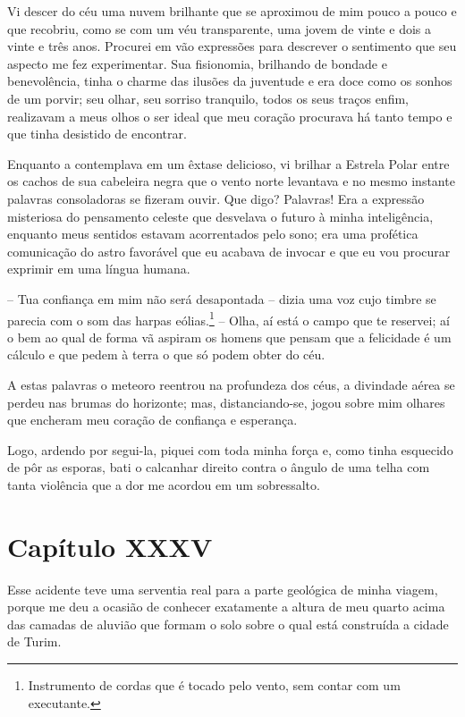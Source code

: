  Vi descer do céu uma nuvem brilhante que se aproximou de mim pouco a
pouco e que recobriu, como se com um véu transparente, uma jovem de
vinte e dois a vinte e três anos. Procurei em vão expressões para
descrever o sentimento que seu aspecto me fez experimentar. Sua
fisionomia, brilhando de bondade e benevolência, tinha o charme das
ilusões da juventude e era doce como os sonhos de um porvir; seu olhar,
seu sorriso tranquilo, todos os seus traços enfim, realizavam a meus olhos
o ser ideal que meu coração procurava há tanto tempo e que tinha
desistido de encontrar.

 Enquanto a contemplava em um êxtase delicioso, vi brilhar a Estrela
Polar entre os cachos de sua cabeleira negra que o vento norte
levantava e no mesmo instante palavras consoladoras se fizeram ouvir.
Que digo? Palavras! Era a expressão misteriosa do pensamento celeste
que desvelava o futuro à minha inteligência, enquanto meus sentidos
estavam acorrentados pelo sono; era uma profética comunicação do astro
favorável que eu acabava de invocar e que eu vou procurar exprimir em
uma língua humana.

 -- Tua confiança em mim não será desapontada -- dizia uma voz cujo
timbre se parecia com o som das harpas eólias.\footnote{ Instrumento de
cordas que é tocado pelo vento, sem contar com um executante.} -- Olha,
aí está o campo que te reservei; aí o bem ao qual de forma vã aspiram
os homens que pensam que a felicidade é um cálculo e que pedem à terra
o que só podem obter do céu.

 A estas palavras o meteoro reentrou na profundeza dos céus, a divindade
aérea se perdeu nas brumas do horizonte; mas, distanciando-se, jogou
sobre mim olhares que encheram meu coração de confiança e esperança.

 Logo, ardendo por segui-la, piquei com toda minha força e, como tinha
esquecido de pôr as esporas, bati o calcanhar direito contra o ângulo
de uma telha com tanta violência que a dor me acordou em um
sobressalto.

\section{Capítulo XXXV}

 Esse acidente teve uma serventia real para a parte geológica de minha
viagem, porque me deu a ocasião de conhecer exatamente a altura de meu
quarto acima das camadas de aluvião que formam o solo sobre o qual está
construída a cidade de Turim.

